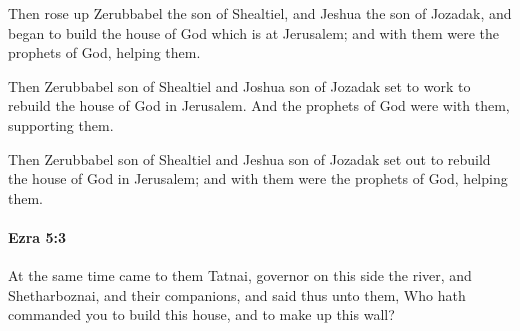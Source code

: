 			\begin{versebox}
					\item[BHS] 
					\item[LXX] 
					\item[ASV] Then rose up Zerubbabel the son of Shealtiel, and Jeshua the son of Jozadak, and began to build the house of God which is at Jerusalem; and with them were the prophets of God, helping them.
					\item[NIV] Then Zerubbabel son of Shealtiel and Joshua son of Jozadak set to work to rebuild the house of God in Jerusalem. And the prophets of God were with them, supporting them.
					\item[NRSV] Then Zerubbabel son of Shealtiel and Jeshua son of Jozadak set out to rebuild the house of God in Jerusalem; and with them were the prophets of God, helping them.
			\end{versebox}

		\paragraph{Ezra 5:3} %
			\label{EZRA-5-3}

			At the same time came to them Tatnai, governor on this side the river, and Shetharboznai, and their companions, and said thus unto them, Who hath commanded you to build this house, and to make up this wall?

